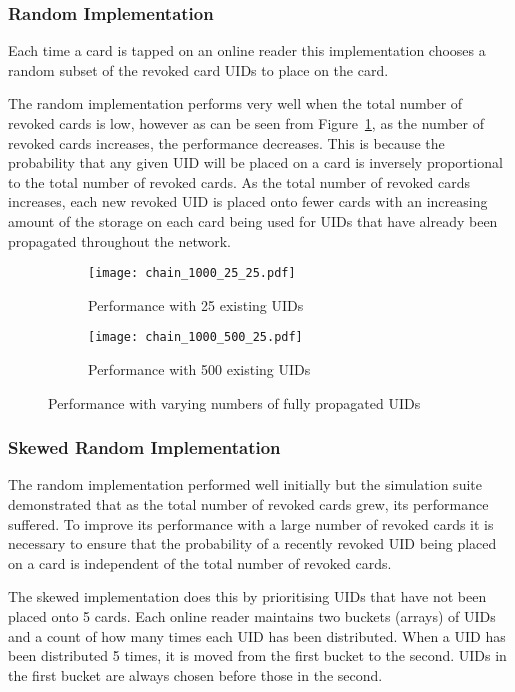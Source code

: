 \documentclass[dissertation.tex]{subfiles}
\begin{document}
  \subsubsection{Random Implementation}
  Each time a card is tapped on an online reader this implementation chooses a random subset of the revoked card UIDs to place on the card.

  The random implementation performs very well when the total number of revoked cards is low, however as can be seen from Figure~\ref{fig:chain_1000_impl}, as the number of revoked cards increases, the performance decreases. This is because the probability that any given UID will be placed on a card is inversely proportional to the total number of revoked cards. As the total number of revoked cards increases, each new revoked UID is placed onto fewer cards with an increasing amount of the storage on each card being used for UIDs that have already been propagated throughout the network.

  \begin{figure}
  \centering
  \begin{subfigure}{.5\textwidth}
    \centering
    \texttt{[image: chain\_1000\_25\_25.pdf]}
    \caption{Performance with 25 existing UIDs}
  \end{subfigure}%
  \begin{subfigure}{.5\textwidth}
    \centering
    \texttt{[image: chain\_1000\_500\_25.pdf]}
    \caption{Performance with 500 existing UIDs}
  \end{subfigure}%
  \caption{Performance with varying numbers of fully propagated UIDs}\label{fig:chain_1000_impl}
  \end{figure}


  \subsubsection{Skewed Random Implementation}\label{sec:skewed}

  The random implementation performed well initially but the simulation suite demonstrated that as the total number of revoked cards grew, its performance suffered. To improve its performance with a large number of revoked cards it is necessary to ensure that the probability of a recently revoked UID being placed on a card is independent of the total number of revoked cards.

  The skewed implementation does this by prioritising UIDs that have not been placed onto 5 cards. Each online reader maintains two buckets (arrays) of UIDs and a count of how many times each UID has been distributed. When a UID has been distributed 5 times, it is moved from the first bucket to the second. UIDs in the first bucket are always chosen before those in the second.
\end{document}
